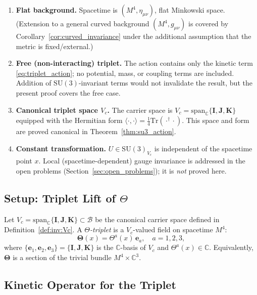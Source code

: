 \documentclass[12pt,a4paper]{article}
\theoremstyle{remark}
\newcommand{\B}{\mathcal{B}}          %
\newcommand{\C}{\mathbb{C}}
\begin{document}
\begin{enumerate}[label=\textbf{A\arabic*.}]
  \item \textbf{Flat background.} Spacetime is $(M^4, \eta_{\mu\nu})$, flat
    Minkowski space.  (Extension to a general curved background
    $(M^4, g_{\mu\nu})$ is covered by Corollary~\ref{cor:curved_invariance}
    under the additional assumption that the metric is fixed/external.)
  \item \textbf{Free (non-interacting) triplet.} The action contains only the
    kinetic term \eqref{eq:triplet_action}; no potential, mass, or coupling
    terms are included.  Addition of $\mathrm{SU}(3)$-invariant terms would
    not invalidate the result, but the present proof covers the free case.
  \item \textbf{Canonical triplet space $V_c$.}  The carrier space is
    $V_c = \mathrm{span}_\C\{\mathbf{I},\mathbf{J},\mathbf{K}\}$
    equipped with the Hermitian form $\langle\cdot,\cdot\rangle =
    \tfrac{1}{4}\mathrm{Tr}(\cdot^\dagger\cdot)$.  This space and form are
    proved canonical in Theorem~\ref{thm:su3_action}.
  \item \textbf{Constant transformation.} $U\in\mathrm{SU}(3)_{V_c}$ is
    independent of the spacetime point $x$.  Local (spacetime-dependent)
    gauge invariance is addressed in the open problems
    (Section~\ref{sec:open_problems}); it is \emph{not} proved here.
\end{enumerate}

\subsection{Setup: Triplet Lift of $\Theta$}
\label{subsec:inv:carrier_space}

Let $V_c = \mathrm{span}_\C\{\mathbf{I},\mathbf{J},\mathbf{K}\}\subset\B$
be the canonical carrier space defined in Definition~\ref{def:inv:Vc}.  A
\emph{$\Theta$-triplet} is a $V_c$-valued field on spacetime $M^4$:
\begin{equation}
  \label{eq:Theta_triplet}
  \boldsymbol{\Theta}(x) = \Theta^a(x)\,\mathbf{e}_a, \quad a = 1,2,3,
\end{equation}
where $\{\mathbf{e}_1,\mathbf{e}_2,\mathbf{e}_3\}=\{\mathbf{I},\mathbf{J},\mathbf{K}\}$
is the $\C$-basis of $V_c$ and $\Theta^a(x)\in\C$.  Equivalently,
$\boldsymbol{\Theta}$ is a section of the trivial bundle $M^4\times\C^3$.

\subsection{Kinetic Operator for the Triplet}
\end{document}
